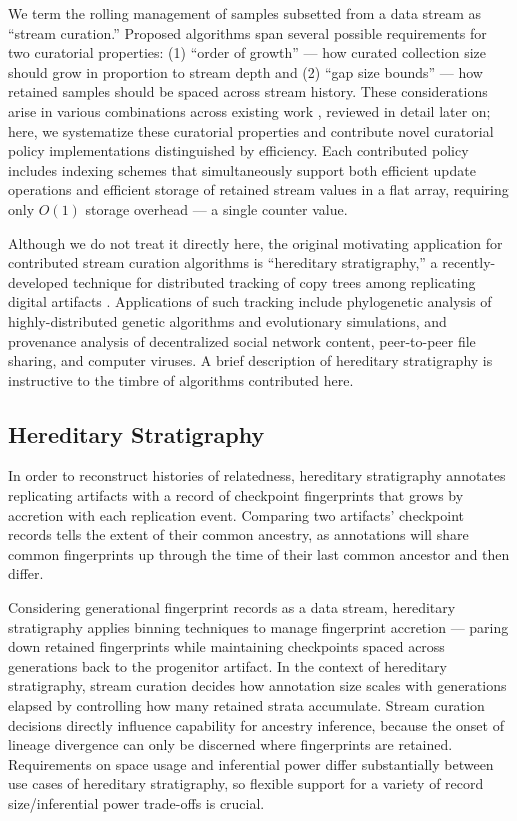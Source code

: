 We term the rolling management of samples subsetted from a data stream as ``stream curation.''
Proposed algorithms span several possible requirements for two curatorial properties: (1) ``order of growth'' --- how curated collection size should grow in proportion to stream depth and (2) ``gap size bounds'' --- how retained samples should be spaced across stream history.
These considerations arise in various combinations across existing work \citep{aggarwal2003framework,han2005stream}, reviewed in detail later on;
here, we systematize these curatorial properties and contribute novel curatorial policy implementations distinguished by efficiency.
Each contributed policy includes indexing schemes that simultaneously support both efficient update operations and efficient storage of retained stream values in a flat array, requiring only $O(1)$ storage overhead --- a single counter value.

Although we do not treat it directly here, the original motivating application for contributed stream curation algorithms is ``hereditary stratigraphy,'' a recently-developed technique for distributed tracking of copy trees among replicating digital artifacts \citep{moreno2022hereditary}.
Applications of such tracking include phylogenetic analysis of highly-distributed genetic algorithms and evolutionary simulations, and provenance analysis of decentralized social network content, peer-to-peer file sharing, and computer viruses.
A brief description of hereditary stratigraphy is instructive to the timbre of algorithms contributed here.

\subsection{Hereditary Stratigraphy}

In order to reconstruct histories of relatedness, hereditary stratigraphy annotates replicating artifacts with a record of checkpoint fingerprints that grows by accretion with each replication event.
Comparing two artifacts' checkpoint records tells the extent of their common ancestry, as annotations will share common fingerprints up through the time of their last common ancestor and then differ.

Considering generational fingerprint records as a data stream, hereditary stratigraphy applies binning techniques to manage fingerprint accretion --- paring down retained fingerprints while maintaining checkpoints spaced across generations back to the progenitor artifact.
In the context of hereditary stratigraphy, stream curation decides how annotation size scales with generations elapsed by controlling how many retained strata accumulate.
Stream curation decisions directly influence capability for ancestry inference, because the onset of lineage divergence can only be discerned where fingerprints are retained.
Requirements on space usage and inferential power differ substantially between use cases of hereditary stratigraphy, so flexible support for a variety of record size/inferential power trade-offs is crucial.

